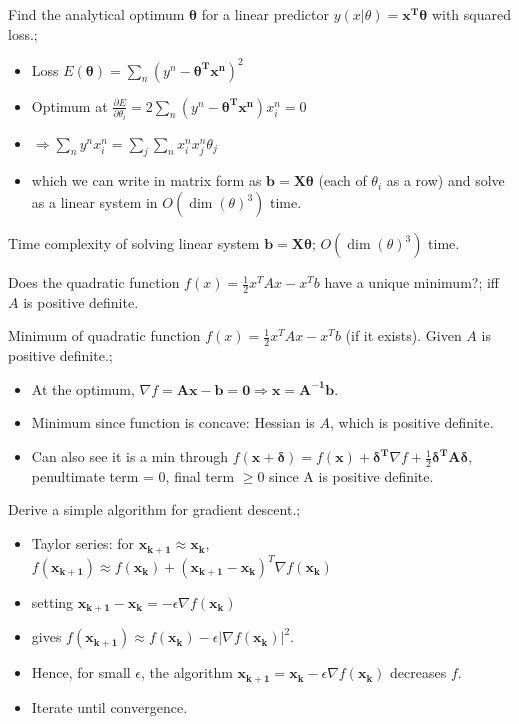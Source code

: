 \documentclass{article}
\begin{document}
Find the analytical optimum $\mathbf{\theta}$ for a linear predictor $y(x|\theta)=\mathbf{x^T \theta}$ with squared loss.; \begin{itemize}
	\item Loss $E(\mathbf{\theta}) = \sum_n (y^n - \mathbf{\theta^Tx^n})^2$
	\item Optimum at $\frac{\partial E}{\partial \theta_i} = 2\sum_n (y^n - \mathbf{\theta^Tx^n})x^n_i = 0$
	\item $\Rightarrow \sum_n y^n x^n_i = \sum_j \sum_n x^n_i x^n_j \theta_j$
	\item which we can write in matrix form as $\mathbf{b = X\theta}$ (each of $\theta_i$ as a row) and solve as a linear system in $O(\dim(\theta)^3)$ time.
\end{itemize}

Time complexity of solving linear system $\mathbf{b=X\theta}$; $O(\dim(\theta)^3)$ time.

Does the quadratic function $f(x)=\frac{1}{2} x^TAx - x^Tb$ have a unique minimum?; iff $A$ is positive definite.


Minimum of quadratic function $f(x)=\frac{1}{2} x^TAx - x^Tb$ (if it exists). Given $A$ is positive definite.; \begin{itemize}
	\item At the optimum, $\nabla f = \mathbf{Ax-b=0}\Rightarrow \mathbf{x = A^{-1}b}$.
	\item Minimum since function is concave: Hessian is $A$, which is positive definite.
	\item Can also see it is a min through $f(\mathbf{x+\delta})=f(\mathbf{x})+\mathbf{\delta^T}\nabla f + \frac{1}{2}\mathbf{\delta^T A\delta}$, penultimate term = 0, final term $\geq 0$ since A is positive definite.
\end{itemize}

Derive a simple algorithm for gradient descent.; \begin{itemize}
	\item Taylor series: for $\mathbf{x_{k+1}\approx x_k}$, $f(\mathbf{x_{k+1}})\approx f(\mathbf{x_k})+(\mathbf{x_{k+1}-x_k})^T\nabla f(\mathbf{x_k})$
	\item setting $\mathbf{x_{k+1}-x_k}=-\epsilon \nabla f(\mathbf{x_k})$
	\item gives $f(\mathbf{x_{k+1}}) \approx f(\mathbf{x_k}) - \epsilon |\nabla f(\mathbf{x_k})|^2$.
	\item Hence, for small $\epsilon$, the algorithm $\mathbf{x_{k+1}}=\mathbf{x_k}-\epsilon\nabla f(\mathbf{x_k})$ decreases $f$. 
	\item Iterate until convergence.
\end{itemize}
\end{document}
